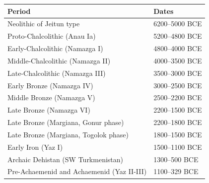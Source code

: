 \documentclass{article}
\begin{document}
\begin{tabular}{ll}
\toprule
Period & Dates \\
\midrule
Neolithic of Jeitun type & 6200–5000 BCE \\
Proto-Chalcolithic (Anau Ia) & 5200–4800 BCE \\
Early-Chalcolithic (Namazga I) & 4800–4000 BCE \\
Middle-Chalcolithic (Namazga II) & 4000–3500 BCE \\
Late-Chalcolithic (Namazga III) & 3500–3000 BCE \\
Early Bronze (Namazga IV) & 3000–2500 BCE \\
Middle Bronze (Namazga V) & 2500–2200 BCE \\
Late Bronze (Namazga VI) & 2200–1500 BCE \\
Late Bronze (Margiana, Gonur phase) & 2200–1800 BCE \\
Late Bronze (Margiana, Togolok phase) & 1800–1500 BCE \\
Early Iron (Yaz I) & 1500–1100 BCE \\
Archaic Dehistan (SW Turkmenistan) & 1300–500 BCE \\
Pre-Achaemenid and Achaemenid (Yaz II-III) & 1100–329 BCE \\
\bottomrule
\end{tabular}
\end{document}
